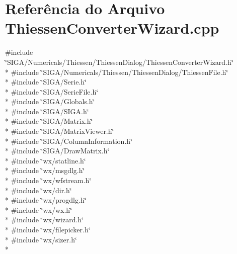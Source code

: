 \section{Referência do Arquivo Thiessen\+Converter\+Wizard.\+cpp}
\label{_thiessen_converter_wizard_8cpp}
{\ttfamily \#include \char`\"{}S\+I\+G\+A/\+Numericals/\+Thiessen/\+Thiessen\+Dialog/\+Thiessen\+Converter\+Wizard.\+h\char`\"{}}\\*
{\ttfamily \#include \char`\"{}S\+I\+G\+A/\+Numericals/\+Thiessen/\+Thiessen\+Dialog/\+Thiessen\+File.\+h\char`\"{}}\\*
{\ttfamily \#include \char`\"{}S\+I\+G\+A/\+Serie.\+h\char`\"{}}\\*
{\ttfamily \#include \char`\"{}S\+I\+G\+A/\+Serie\+File.\+h\char`\"{}}\\*
{\ttfamily \#include \char`\"{}S\+I\+G\+A/\+Globals.\+h\char`\"{}}\\*
{\ttfamily \#include \char`\"{}S\+I\+G\+A/\+S\+I\+G\+A.\+h\char`\"{}}\\*
{\ttfamily \#include \char`\"{}S\+I\+G\+A/\+Matrix.\+h\char`\"{}}\\*
{\ttfamily \#include \char`\"{}S\+I\+G\+A/\+Matrix\+Viewer.\+h\char`\"{}}\\*
{\ttfamily \#include \char`\"{}S\+I\+G\+A/\+Column\+Information.\+h\char`\"{}}\\*
{\ttfamily \#include \char`\"{}S\+I\+G\+A/\+Draw\+Matrix.\+h\char`\"{}}\\*
{\ttfamily \#include \char`\"{}wx/statline.\+h\char`\"{}}\\*
{\ttfamily \#include \char`\"{}wx/msgdlg.\+h\char`\"{}}\\*
{\ttfamily \#include \char`\"{}wx/wfstream.\+h\char`\"{}}\\*
{\ttfamily \#include \char`\"{}wx/dir.\+h\char`\"{}}\\*
{\ttfamily \#include \char`\"{}wx/progdlg.\+h\char`\"{}}\\*
{\ttfamily \#include \char`\"{}wx/wx.\+h\char`\"{}}\\*
{\ttfamily \#include \char`\"{}wx/wizard.\+h\char`\"{}}\\*
{\ttfamily \#include \char`\"{}wx/filepicker.\+h\char`\"{}}\\*
{\ttfamily \#include \char`\"{}wx/sizer.\+h\char`\"{}}\\*

